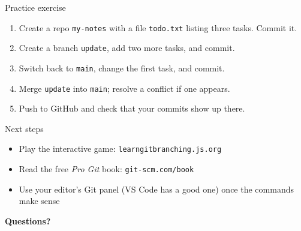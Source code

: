 \documentclass[aspectratio=169,11pt]{beamer}
\begin{document}
\begin{frame}{Practice exercise}
  \begin{enumerate}
    \item Create a repo \texttt{my-notes} with a file \texttt{todo.txt} listing three tasks.
          Commit it.
    \item Create a branch \texttt{update}, add two more tasks, and commit.
    \item Switch back to \texttt{main}, change the first task, and commit.
    \item Merge \texttt{update} into \texttt{main}; resolve a conflict if one appears.
    \item Push to GitHub and check that your commits show up there.
  \end{enumerate}
\end{frame}

\begin{frame}{Next steps}
  \begin{itemize}
    \item Play the interactive game: \texttt{learngitbranching.js.org}
    \item Read the free \emph{Pro Git} book: \texttt{git-scm.com/book}
    \item Use your editor's Git panel (VS Code has a good one) once the commands make sense
  \end{itemize}

  \vspace{2em}
  \begin{center}
    {\Large \textbf{Questions?}}
  \end{center}
\end{frame}
\end{document}
